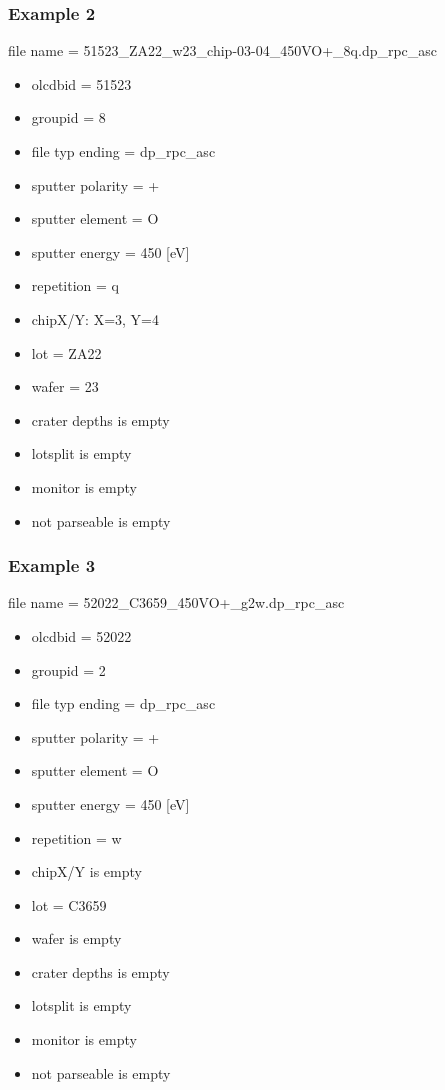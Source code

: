\documentclass[a4paper,10pt]{article}
\begin{document}
\subsubsection{Example 2}
file name = 51523\_ZA22\_w23\_chip-03-04\_450VO+\_8q.dp\_rpc\_asc
\begin{itemize}
 \item olcdbid = 51523
 \item groupid = 8
 \item file typ ending = dp\_rpc\_asc
 \item sputter polarity = +
 \item sputter element = O
 \item sputter energy = 450 [eV]
 \item repetition = q
 \item chipX/Y: X=3, Y=4
 \item lot = ZA22
 \item wafer = 23
 \item crater depths is empty
 \item lotsplit is empty
 \item monitor is empty
 \item not parseable is empty
\end{itemize}

\subsubsection{Example 3}
file name = 52022\_C3659\_450VO+\_g2w.dp\_rpc\_asc
\begin{itemize}
 \item olcdbid = 52022
 \item groupid = 2
 \item file typ ending = dp\_rpc\_asc
 \item sputter polarity = +
 \item sputter element = O
 \item sputter energy = 450 [eV]
 \item repetition = w
 \item chipX/Y is empty
 \item lot = C3659
 \item wafer is empty
 \item crater depths is empty
 \item lotsplit is empty
 \item monitor is empty
 \item not parseable is empty
\end{itemize}
\end{document}
